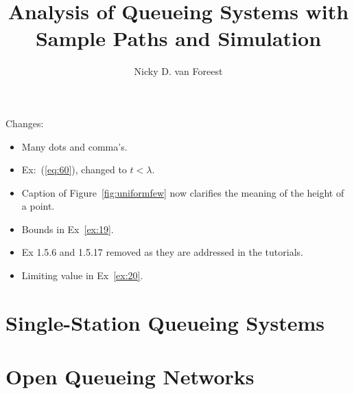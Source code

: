 \author{Nicky D. van  Foreest}
\title{Analysis of Queueing Systems with  Sample Paths and Simulation }


\maketitle

Changes:
\begin{itemize}
\item Many dots and comma's. 
\item Ex:~(\ref{eq:60}), changed to $t<\lambda$. 
\item Caption of Figure~\ref{fig:uniformfew} now clarifies the meaning of the height of a point. 
\item Bounds in Ex~\ref{ex:19}.
\item Ex 1.5.6 and 1.5.17 removed as they are  addressed in the tutorials. 
\item Limiting value in Ex~\ref{ex:20}. 
\end{itemize}

\tableofcontents




\chapter{Single-Station Queueing Systems}
\label{cha:single-stat-queu}



















%
 



%


\chapter{Open Queueing Networks}
\label{sec:notes-relat-chapt2}

